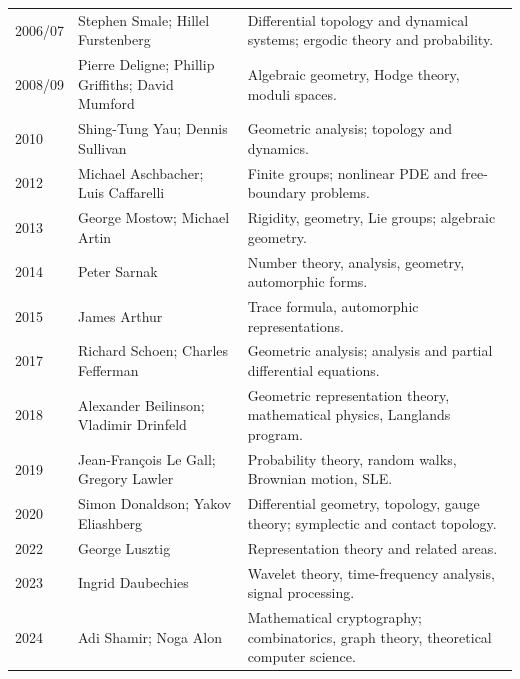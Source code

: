 {\begin{longtable}{@{}L{0.09\textwidth}L{0.38\textwidth}L{0.45\textwidth}@{}}
        2006/07 & Stephen Smale; Hillel Furstenberg
        & Differential topology and dynamical systems; ergodic theory and probability. \\

        2008/09 & Pierre Deligne; Phillip Griffiths; David Mumford
        & Algebraic geometry, Hodge theory, moduli spaces. \\

        2010 & Shing-Tung Yau; Dennis Sullivan
        & Geometric analysis; topology and dynamics. \\

        2012 & Michael Aschbacher; Luis Caffarelli
        & Finite groups; nonlinear PDE and free-boundary problems. \\

        2013 & George Mostow; Michael Artin
        & Rigidity, geometry, Lie groups; algebraic geometry. \\

        2014 & Peter Sarnak
        & Number theory, analysis, geometry, automorphic forms. \\

        2015 & James Arthur
        & Trace formula, automorphic representations. \\

        2017 & Richard Schoen; Charles Fefferman
        & Geometric analysis; analysis and partial differential equations. \\

        2018 & Alexander Beilinson; Vladimir Drinfeld
        & Geometric representation theory, mathematical physics, Langlands program. \\

        2019 & Jean-François Le Gall; Gregory Lawler
        & Probability theory, random walks, Brownian motion, SLE. \\

        2020 & Simon Donaldson; Yakov Eliashberg
        & Differential geometry, topology, gauge theory; symplectic and contact topology. \\

        2022 & George Lusztig
        & Representation theory and related areas. \\

        2023 & Ingrid Daubechies
        & Wavelet theory, time-frequency analysis, signal processing. \\

        2024 & Adi Shamir; Noga Alon
        & Mathematical cryptography; combinatorics, graph theory, theoretical computer science. \\
    \end{longtable}
    }

